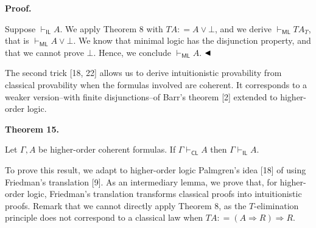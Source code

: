 \par\medskip\noindent\textbf{Proof.}\par
 
 
Suppose $\vdash_{\mathsf{IL}}A$. We apply Theorem 8 with $TA\mathrel{\mathop{:}}=A\mathbin{\vee}\bot$, and we derive $\vdash_{\mathsf{ML}}TA_{T}$, that is $\vdash_{\mathsf{ML}}A\mathbin{\vee}\bot$. We know that minimal logic has the disjunction property, and that we cannot prove $\bot$. Hence, we conclude $\vdash_{\mathsf{ML}}A$. $\hfill\blacktriangleleft$\par
 
 
 
The second trick [18, 22] allows us to derive intuitionistic provability from classical provability when the formulas involved are coherent. It corresponds to a weaker version–with finite disjunctions–of Barr’s theorem [2] extended to higher-order logic.\par
 
 
 
\par\medskip\noindent\textbf{Theorem 15.}\par
 
 
Let $\Gamma,A$ be higher-order coherent formulas. If $\Gamma\vdash_{\mathsf{CL}}A$ then $\Gamma\vdash_{\mathsf{IL}}A$.\par
 
 
 
 
To prove this result, we adapt to higher-order logic Palmgren’s idea [18] of using Friedman’s translation [9]. As an intermediary lemma, we prove that, for higher-order logic, Friedman’s translation transforms classical proofs into intuitionistic proofs. Remark that we cannot directly apply Theorem 8, as the $T$-elimination principle does not correspond to a classical law when $TA\mathrel{\mathop{:}}=(A\mathbin{\Rightarrow}R)\mathbin{\Rightarrow}R$.\par
 
 
 
